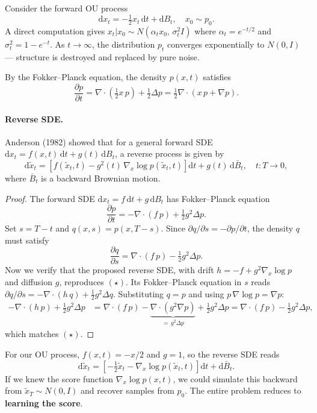\begin{exam}
    Consider the forward OU process
\[
\mathrm{d}x_t = -\tfrac{1}{2}x_t\,\mathrm{d}t + \mathrm{d}B_t, \quad x_0 \sim p_0.
\]
A direct computation gives $x_t | x_0 \sim N(\alpha_t x_0,\, \sigma_t^2 I)$ where $\alpha_t = e^{-t/2}$ and $\sigma_t^2 = 1 - e^{-t}$. As $t \to \infty$, the distribution $p_t$ converges exponentially to $N(0, I)$ --- structure is destroyed and replaced by pure noise.

By the Fokker--Planck equation, the density $p(x,t)$ satisfies
\[
\frac{\partial p}{\partial t} = \nabla \cdot \left(\tfrac{1}{2}x\, p\right) + \tfrac{1}{2}\Delta p = \tfrac{1}{2}\nabla \cdot \left(x\, p + \nabla p\right).
\]

\paragraph{Reverse SDE.} Anderson (1982) showed that for a general forward SDE $\mathrm{d}x_t = f(x,t)\,\mathrm{d}t + g(t)\,\mathrm{d}B_t$, a reverse process is given by
\[
\mathrm{d}\tilde{x}_t = \left[f(\tilde{x}_t, t) - g^2(t)\,\nabla_x \log p(\tilde{x}_t, t)\right]\mathrm{d}t + g(t)\,\mathrm{d}\bar{B}_t, \quad t: T \to 0,
\]
where $\bar{B}_t$ is a backward Brownian motion.
\begin{proof}
The forward SDE $\mathrm{d}x_t = f\,\mathrm{d}t + g\,\mathrm{d}B_t$ has Fokker--Planck equation
\[
\frac{\partial p}{\partial t} = -\nabla \cdot (f\, p) + \tfrac{1}{2}g^2 \Delta p.
\]
Set $s = T - t$ and $q(x,s) = p(x, T-s)$. Since $\partial q / \partial s = -\partial p / \partial t$, the density $q$ must satisfy
\[
\frac{\partial q}{\partial s} = \nabla \cdot (f\,p) - \tfrac{1}{2}g^2 \Delta p. \tag{$\star$}
\]
Now we verify that the proposed reverse SDE, with drift $h = -f + g^2 \nabla_x \log p$ and diffusion $g$, reproduces $(\star)$. Its Fokker--Planck equation in $s$ reads $\partial q / \partial s = -\nabla \cdot (h\,q) + \tfrac{1}{2}g^2 \Delta q$. Substituting $q = p$ and using $p\,\nabla \log p = \nabla p$:
\begin{align*}
-\nabla \cdot (h\,p) + \tfrac{1}{2}g^2 \Delta p
&= \nabla \cdot (f\,p) - \underbrace{\nabla \cdot (g^2 \nabla p)}_{=\, g^2 \Delta p} + \tfrac{1}{2}g^2 \Delta p
= \nabla \cdot (f\,p) - \tfrac{1}{2}g^2 \Delta p,
\end{align*}
which matches $(\star)$.
\end{proof}

For our OU process, $f(x,t) = -x/2$ and $g = 1$, so the reverse SDE reads
\[
\mathrm{d}\tilde{x}_t = \left[-\tfrac{1}{2}\tilde{x}_t - \nabla_x \log p(\tilde{x}_t, t)\right]\mathrm{d}t + \mathrm{d}\bar{B}_t.
\]
If we knew the score function $\nabla_x \log p(x,t)$, we could simulate this backward from $\tilde{x}_T \sim N(0,I)$ and recover samples from $p_0$. The entire problem reduces to \textbf{learning the score}.


\end{exam}
